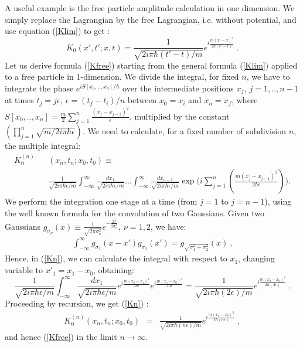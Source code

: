 \documentclass[12pt]{article}   %
\begin{document}
A useful example is the free particle amplitude calculation in
one dimension. We simply replace the Lagrangian by the free
Lagrangian, i.e. without potential, and use equation
(\ref{Klim}) to get :
\begin{equation}\label{Kfree}
K_0(x',t';x,t)=\frac{1}{\sqrt{2i\pi \hbar(t'-t)/m}}
e^{i\frac{m(x'-x)^2}{2\hbar (t'-t)}}\ .
\end{equation}
Let us derive formula (\ref{Kfree}) starting from the general formula (\ref{Klim})
applied to a free particle in 1-dimension.
We divide the integral, for fixed $n$, we have to integrate the phase $e^{i S[x_0,..,x_n]/\hbar}$
over the intermediate positions $x_j,\ j=1,..,n-1$ at times $t_j=j\epsilon,\ \epsilon=(t_f-t_i)/n$ 
between $x_0=x_i$ and $x_n=x_f$, where $S[x_0,..,x_n]=\frac{m}{2}\sum_{j=1}^n\frac{(x_j-x_{j-1})^2}{\epsilon}$,
multiplied by the constant $\left(\prod_{j=1}^{n}\sqrt{m/2i\pi\hbar\epsilon}\right)$. 
We need to calculate, for a fixed number of subdivision $n$,
the multiple integral:
\begin{eqnarray}\label{Kn}
K_0^{(n)}&&(x_n,t_n;x_0,t_0)\equiv
{}\nonumber{}\\{}&&\frac{1}{\sqrt{2i\pi \hbar\epsilon/m}}\int_{-\infty}^{\infty}
\frac{dx_1}{\sqrt{2i\pi \hbar\epsilon/m}}
\ldots\int_{-\infty}^{\infty}\frac{dx_{n-1}}{\sqrt{2i\pi \hbar\epsilon/m}}
\exp{\bigl(i\sum_{j=1}^{n}(\frac{m(x_{j}-x_{j-1})^2}{2\hbar\epsilon})
\bigr)}.
\end{eqnarray}
We perform the integration one stage at a time (from $j=1$ to $j=n-1$),
using the well known formula for the convolution of two Gaussians.
Given two Gaussians $g_{\sigma_\nu}(x)\equiv\frac{1}{\sqrt{2\pi\sigma_\nu^2}}
e^{-\frac{x^2}{2\sigma_\nu^2}},\ \nu=1,2$, we have:
\begin{eqnarray}\label{GaussianConvo}
\int_{-\infty}^{\infty}g_{\sigma_1}(x-x')g_{\sigma_2}(x')=g_{\sqrt{\sigma_1^2+\sigma_2^2}}(x)\ . 
\end{eqnarray}
Hence, in (\ref{Kn}), we can calculate the integral with respect to $x_1$,
changing variable to $x'_1=x_1-x_0$, obtaining:
\[
\frac{1}{\sqrt{2i\pi \hbar\epsilon/m}}\int_{-\infty}^{\infty}\frac{dx_1}{\sqrt{2i\pi \hbar\epsilon/m}}
e^{i\frac{m(x_{2}-x_{1})^2}{2\hbar\epsilon}}e^{i\frac{m(x_{1}-x_0)^2}{2\hbar\epsilon}}=\frac{1}{\sqrt{2i\pi \hbar(2\epsilon)/m}}e^{i\frac{m(x_{2}-x_0)^2}{2\hbar(2\epsilon)}}\ .
\]
Proceeding by recursion, we get (\ref{Kn}) :
\begin{eqnarray*}
K_0^{(n)}(x_n,t_n;x_0,t_0)&=&\frac{1}{\sqrt{2i\pi \hbar(n\epsilon)/m}}e^{i\frac{m(x_{n}-x_0)^2}{2\hbar(n\epsilon)}}\ ,
\end{eqnarray*}
and hence (\ref{Kfree}) in the limit $n\rightarrow\infty$.
\end{document}
